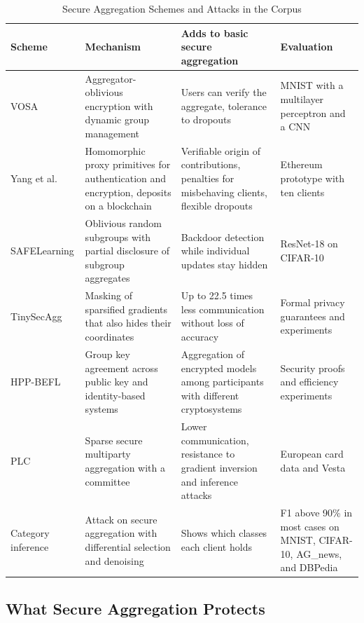 \documentclass[journal]{IEEEtran}
\begin{document}
\begin{table}[!t]
\centering
\caption{Secure Aggregation Schemes and Attacks in the Corpus}
\label{tab:sa}
\footnotesize
\begin{tabularx}{\textwidth}{@{}L{2.2cm}YL{3.6cm}L{3.9cm}@{}}
\toprule
\textbf{Scheme} & \textbf{Mechanism} & \textbf{Adds to basic secure aggregation} & \textbf{Evaluation}\\
\midrule
VOSA \cite{wang2023vosa} & Aggregator-oblivious encryption with dynamic group management & Users can verify the aggregate, tolerance to dropouts & MNIST with a multilayer perceptron and a CNN\\
Yang et al. \cite{yang2022accountable} & Homomorphic proxy primitives for authentication and encryption, deposits on a blockchain & Verifiable origin of contributions, penalties for misbehaving clients, flexible dropouts & Ethereum prototype with ten clients\\
SAFELearning \cite{zhang2023safelearning} & Oblivious random subgroups with partial disclosure of subgroup aggregates & Backdoor detection while individual updates stay hidden & ResNet-18 on CIFAR-10\\
TinySecAgg \cite{sami2024tinysecagg} & Masking of sparsified gradients that also hides their coordinates & Up to 22.5 times less communication without loss of accuracy & Formal privacy guarantees and experiments\\
HPP-BEFL \cite{xiong2025hppbefl} & Group key agreement across public key and identity-based systems & Aggregation of encrypted models among participants with different cryptosystems & Security proofs and efficiency experiments\\
PLC \cite{li2026plc} & Sparse secure multiparty aggregation with a committee & Lower communication, resistance to gradient inversion and inference attacks & European card data and Vesta\\
Category inference \cite{gao2023category} & Attack on secure aggregation with differential selection and denoising & Shows which classes each client holds & F1 above 90\% in most cases on MNIST, CIFAR-10, AG\_news, and DBPedia\\
\bottomrule
\end{tabularx}
\end{table}

\subsection{What Secure Aggregation Protects}
\end{document}
